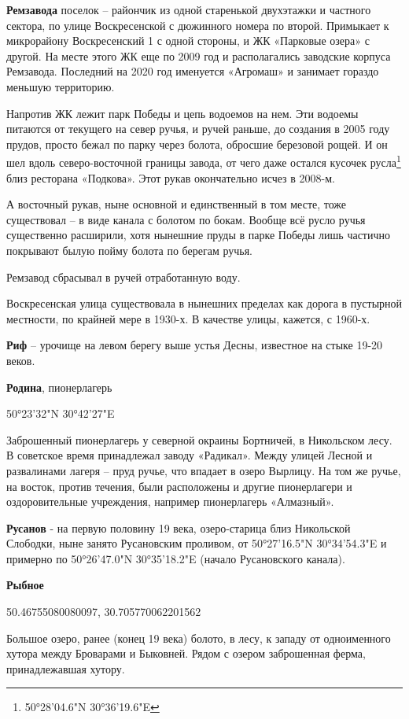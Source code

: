 \medskip

\textbf{Ремзавода} поселок – райончик из одной старенькой двухэтажки и частного сектора, по улице Воскресенской с дюжинного номера по второй. Примыкает к микрорайону Воскресенский 1 с одной стороны, и ЖК «Парковые озера» с другой. На месте этого ЖК еще по 2009 год и располагались заводские корпуса Ремзавода. Последний на 2020 год именуется «Агромаш» и занимает гораздо меньшую территорию.

Напротив ЖК лежит парк Победы и цепь водоемов на нем. Эти водоемы питаются от текущего на север ручья, и ручей раньше, до создания в 2005 году прудов, просто бежал по парку через болота, обросшие березовой рощей. И он шел вдоль северо-восточной границы завода, от чего даже остался кусочек русла\footnote{50°28'04.6"N 30°36'19.6"E} близ ресторана «Подкова». Этот рукав окончательно исчез в 2008-м. 

А восточный рукав, ныне основной и единственный в том месте, тоже существовал – в виде канала с болотом по бокам. Вообще всё русло ручья существенно расширили, хотя нынешние пруды в парке Победы лишь частично покрывают былую пойму болота по берегам ручья.

Ремзавод сбрасывал в ручей отработанную воду.

Воскресенская улица существовала в нынешних пределах как дорога в пустырной местности, по крайней мере в 1930-х. В качестве улицы, кажется,  с 1960-х.\\

\medskip

\textbf{Риф} – урочище на левом берегу выше устья Десны, известное на стыке 19-20 веков.\\

\medskip

\textbf{Родина}, пионерлагерь

50°23'32"N 30°42'27"E

Заброшенный пионерлагерь у северной окраины Бортничей, в Никольском лесу. В советское время принадлежал заводу «Радикал». Между улицей Лесной и развалинами лагеря – пруд ручье, что впадает в озеро Вырлицу. На том же ручье, на восток, против течения, были расположены и другие пионерлагери и оздоровительные учреждения, например пионерлагерь «Алмазный».\\

\medskip


\textbf{Русанов} - на первую половину 19 века, озеро-старица близ Никольской Слободки, ныне занято Русановским проливом, от 50°27'16.5"N 30°34'54.3"E и примерно по 50°26'47.0"N 30°35'18.2"E (начало Русановского канала).\\

\medskip


\textbf{Рыбное} 

50.46755080080097, 30.705770062201562

Большое озеро, ранее (конец 19 века) болото, в лесу, к западу от одноименного хутора между Броварами и Быковней. Рядом с озером заброшенная ферма, принадлежавшая хутору.
